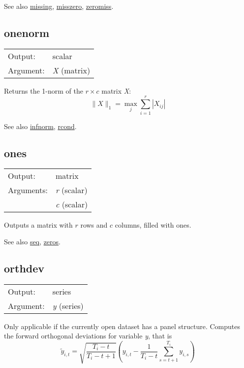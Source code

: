 	  See also \hyperlink{func-missing}{missing}, \hyperlink{func-misszero}{misszero}, \hyperlink{func-zeromiss}{zeromiss}.

\subsection{onenorm}
\hypertarget{func-onenorm}{}

\begin{tabular}{ll}
Output:     & scalar\\
Argument:   & \textsl{X} (matrix)\\
\end{tabular}

	  Returns the 1-norm of the $r \times c$ matrix
	  \textsl{X}: 
	  \[\| X \|_1 = \max_j \sum_{i=1}^r |X_{ij}| \]

	  See also \hyperlink{func-infnorm}{infnorm}, \hyperlink{func-rcond}{rcond}.

\subsection{ones}
\hypertarget{func-ones}{}

\begin{tabular}{ll}
Output:     & matrix\\
Arguments:  & \textsl{r} (scalar)\\
           & \textsl{c} (scalar)\\
\end{tabular}

	  Outputs a matrix with \ensuremath{r} rows and \ensuremath{c}
	  columns, filled with ones.

	  See also \hyperlink{func-seq}{seq}, \hyperlink{func-zeros}{zeros}.

\subsection{orthdev}
\hypertarget{func-orthdev}{}

\begin{tabular}{ll}
Output:     & series\\
Argument:   & \textsl{y} (series)\\
\end{tabular}

	  Only applicable if the currently open dataset has a panel
	  structure. Computes the forward orthogonal deviations for
	  variable \textsl{y}, that is 
	  \[ \tilde{y}_{i,t} =
	  \sqrt{ \frac{T_i - t}{T_i - t + 1}} \left( y_{i,t} -
	  \frac{1}{T_i - t} \sum_{s=t+1}^{T_i} y_{i,s} \right) \]

